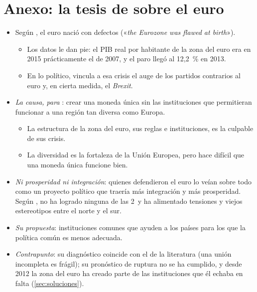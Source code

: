 \documentclass[11pt]{article}
\begin{document}
\begin{infografia}[H]
\centering
\caption{La lógica de la teoría de las áreas monetarias óptimas}\label{figu:logica-amo}
\end{infografia}

\section{Anexo: la tesis de  sobre el euro}\label{anexo:stiglitz}

\begin{itemize}
\item Según \textcite{Stiglitz2016Euro}, el euro nació con defectos («\emph{the Eurozone was flawed at birth}»).
  \begin{itemize}
  \item Los datos le dan pie: el PIB real por habitante de la zona del euro era en 2015 prácticamente el de 2007, y el paro llegó al 12,2~\% en 2013\nocite{Eurostat2026Nama10pc,Eurostat2026UneRtA}.
  \item En lo político,  vincula a esa crisis el auge de los partidos contrarios al euro y, en cierta medida, el \emph{Brexit}\nocite{Stiglitz2016Guardian}.
  \end{itemize}
\item \emph{La causa, para }: crear una moneda única sin las instituciones que permitieran funcionar a una región tan diversa como Europa.
  \begin{itemize}
  \item La estructura de la zona del euro, sus reglas e instituciones, es la culpable de sus crisis.
  \item La diversidad es la fortaleza de la Unión Europea, pero hace difícil que una moneda única funcione bien.
  \end{itemize}
\item \emph{Ni prosperidad ni integración}: quienes defendieron el euro lo veían sobre todo como un proyecto político que traería más integración y más prosperidad. Según , no ha logrado ninguna de las 2~y ha alimentado tensiones y viejos estereotipos entre el norte y el sur.
\item \emph{Su propuesta}: instituciones comunes que ayuden a los países para los que la política común es menos adecuada.
\item \emph{Contrapunto}: su diagnóstico coincide con el de la literatura (una unión incompleta es frágil); su pronóstico de ruptura no se ha cumplido, y desde 2012 la zona del euro ha creado parte de las instituciones que él echaba en falta (\ref{sec:soluciones}).
\end{itemize}
\end{document}
